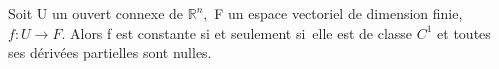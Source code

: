 %
%
%
%
%
%
%
%
%
\begin{cor}
  Soit U un ouvert connexe de $\mathbb{R}^n,$ F un
espace vectoriel de dimension finie, $f : U \longrightarrow F.$ Alors f est constante si
et seulement si~elle est de classe $C^1$ et toutes ses dérivées
partielles sont nulles.
\end{cor}
